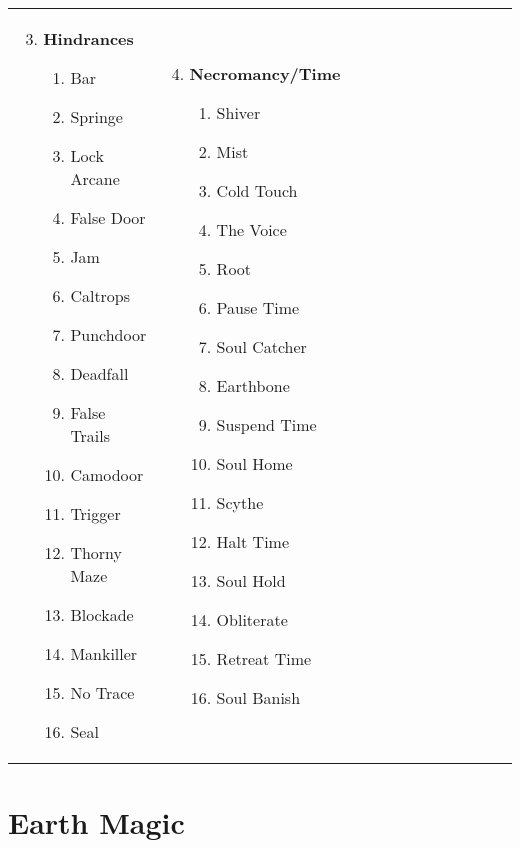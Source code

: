 \begin{tabular}{@{} p{0.25\linewidth} p{0.25\linewidth} p{0.25\linewidth} p{0.25\linewidth}}
\begin{enumerate}
	\setcounter{enumi}{2}
	\item \textbf{Hindrances}
	\begin{enumerate}
		\item Bar
		\item Springe
		\item Lock Arcane
		\item False Door
		\item Jam
		\item Caltrops
		\item Punchdoor
		\item Deadfall
		\item False Trails
		\item Camodoor
		\item Trigger
		\item Thorny Maze
		\item Blockade
		\item Mankiller
		\item No Trace
		\item Seal
	\end{enumerate}
\end{enumerate} &
\begin{enumerate}
	\setcounter{enumi}{3}
	\item \textbf{Necromancy/Time}
	\begin{enumerate}
		\item Shiver
		\item Mist
		\item Cold Touch
		\item The Voice
		\item Root
		\item Pause Time
		\item Soul Catcher
		\item Earthbone
		\item Suspend Time
		\item Soul Home
		\item Scythe
		\item Halt Time
		\item Soul Hold
		\item Obliterate
		\item Retreat Time
		\item Soul Banish
	\end{enumerate}
\end{enumerate} \\
\end{tabular}
\pagebreak
\section{Earth Magic}

